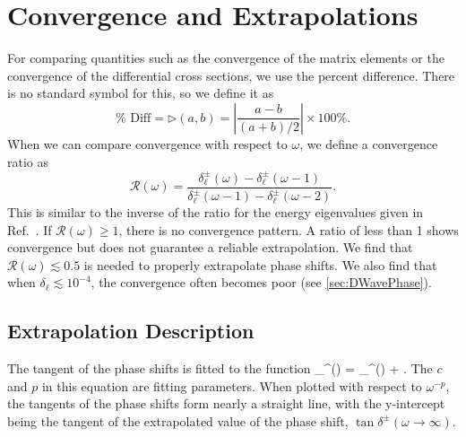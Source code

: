 \documentclass[Dissertation.tex]{subfiles}
\begin{document}





\section{Convergence and Extrapolations}
\label{sec:Extrapolations}

For comparing quantities such as the convergence of the matrix elements or 
the convergence of the differential cross sections, we use the percent
difference. There is no standard symbol for this, so we define it as
\begin{equation}
\label{eq:PercentDiff}
\% \text{ Diff} = \rhd(a,b) = \left| \frac{a - b}{(a + b) / 2} \right| \times 100\%.
\end{equation}
When we can compare convergence with respect to $\omega$, we define a
convergence ratio as
\begin{equation}
\label{eq:ConvRatio}
\mathcal{R}(\omega) = \frac{\delta_\ell^\pm(\omega)-\delta_\ell^\pm(\omega-1)}
  {\delta_\ell^\pm(\omega-1)-\delta_\ell^\pm(\omega-2)}.
\end{equation}
This is similar to the inverse of the ratio for the energy eigenvalues given in
Ref.~\cite{Yan1999}. If $\mathcal{R}(\omega) \geq 1$, there is no convergence
pattern. A ratio of less than 1 shows convergence but does not guarantee a
reliable extrapolation. We find that $\mathcal{R}(\omega) \lesssim 0.5$ is
needed to properly extrapolate phase shifts. We also find that when
$\delta_\ell \lesssim 10^{-4}$, the convergence often becomes poor
(see \cref{sec:DWavePhase}).

\subsection{Extrapolation Description}


The tangent of the phase shifts is fitted to the function
\beq
\label{eq:PhaseExtrap}
\tan \delta_\ell^\pm(\omega) = \tan \delta_\ell^\pm(\omega \to \infty) + .
\eeq
The $c$ and $p$ in this equation are fitting parameters. When plotted with respect to $\omega^{-p}$, the tangents of the phase shifts form nearly a straight line, with the y-intercept being the tangent of the extrapolated value of the phase shift, $\tan \delta^\pm(\omega \to \infty)$.
\end{document}
